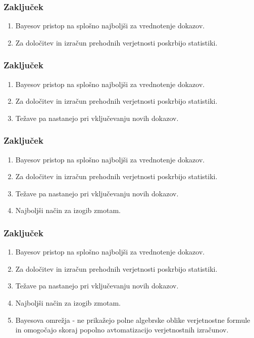 \documentclass{beamer}
\begin{document}
\begin{frame}
   \frametitle{Zaključek}
   \begin{enumerate}
      \item Bayesov pristop na splošno najboljši za vrednotenje dokazov.
      \item Za določitev in izračun prehodnih verjetnosti poskrbijo statistiki.
   \end{enumerate}
\end{frame}

\begin{frame}
   \frametitle{Zaključek}
   \begin{enumerate}
      \item Bayesov pristop na splošno najboljši za vrednotenje dokazov.
      \item Za določitev in izračun prehodnih verjetnosti poskrbijo statistiki.
      \item Težave pa nastanejo pri vključevanju novih dokazov.
   \end{enumerate}
\end{frame}

\begin{frame}
   \frametitle{Zaključek}
   \begin{enumerate}
      \item Bayesov pristop na splošno najboljši za vrednotenje dokazov.
      \item Za določitev in izračun prehodnih verjetnosti poskrbijo statistiki.
      \item Težave pa nastanejo pri vključevanju novih dokazov.
      \item Najboljši način za izogib zmotam.
   \end{enumerate}
\end{frame}

\begin{frame}
   \frametitle{Zaključek}
   \begin{enumerate}
      \item Bayesov pristop na splošno najboljši za vrednotenje dokazov.
      \item Za določitev in izračun prehodnih verjetnosti poskrbijo statistiki.
      \item Težave pa nastanejo pri vključevanju novih dokazov.
      \item Najboljši način za izogib zmotam.
      \item Bayesova omrežja - ne prikažejo polne algebrske oblike verjetnostne formule in omogočajo skoraj popolno avtomatizacijo verjetnostnih izračunov.
   \end{enumerate}
\end{frame}
\end{document}
